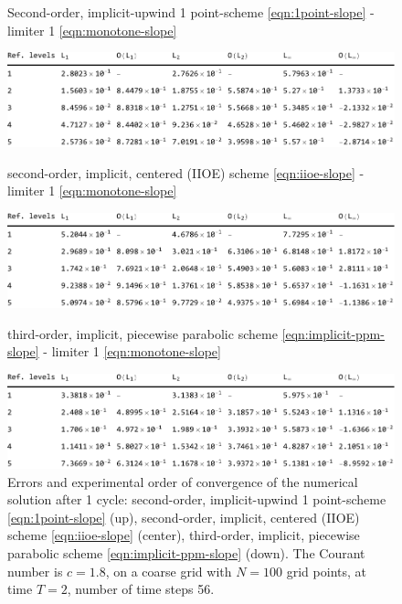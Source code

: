 \documentclass[../thesis.tex]{subfiles}
\begin{document}
\begin{figure}[H]
	\centering
    \caption*{Second-order, implicit-upwind 1 point-scheme \eqref{eqn:1point-slope} - limiter 1 \eqref{eqn:monotone-slope}}
	\includegraphics[width=\textwidth]{../tab/tab-1point-c1p8-T2-limit1-shu.pdf}
    \caption*{second-order, implicit, centered (IIOE) scheme \eqref{eqn:iioe-slope} - limiter 1 \eqref{eqn:monotone-slope}}
	\includegraphics[width=\textwidth]{../tab/tab-iioe-c1p8-T2-limit1-shu.pdf}
    \caption*{third-order, implicit, piecewise parabolic scheme \eqref{eqn:implicit-ppm-slope} - limiter 1 \eqref{eqn:monotone-slope}}
	\includegraphics[width=\textwidth]{../tab/tab-implicit-ppm-c1p8-T2-limit1-shu.pdf}
	\caption{Errors and experimental order of convergence of the numerical solution after 1 cycle: second-order, implicit-upwind 1 point-scheme \eqref{eqn:1point-slope} (up), second-order, implicit, centered (IIOE) scheme \eqref{eqn:iioe-slope} (center), third-order, implicit, piecewise parabolic scheme \eqref{eqn:implicit-ppm-slope} (down). The Courant number is \(c = 1.8\), on a coarse grid with \(N = 100\) grid points, at time \(T = 2\), number of time steps 56.}
	\label{tab:c1p8-T2-limit1-shu}
\end{figure}
\end{document}
